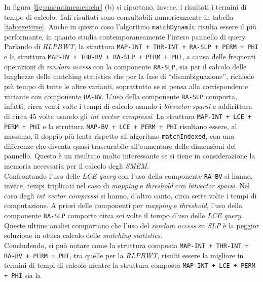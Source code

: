 In figura \ref{fig:smemtimememchr} (b) si riportano, invece, i risultati i
termini di tempo di calcolo. Tali risultati sono
consultabili numericamente in tabella \ref{tab:exetime}. Anche in questo caso
l'algoritmo 
\texttt{matchDynamic} risulta essere il più performante, in quanto studia
contemporaneamente l'intero pannello di query. Parlando di \textit{RLPBWT},  la
struttura \texttt{MAP-INT + THR-INT + RA-SLP + PERM + PHI} e la 
struttura 
\texttt{MAP-BV + THR-BV + RA-SLP + PERM + PHI}, a causa delle
frequenti operazioni di \textit{random access} con la componente
\texttt{RA-SLP}, sia per il calcolo delle lunghezze delle 
matching statistics che per la fase di ``disambiguazione'', richiede più tempo
di tutte le altre varianti, soprattutto se si pensa alla corrispondente
variante con componente \texttt{RA-BV}. L'uso della componente \texttt{RA-SLP}
comporta, infatti, circa venti volte i tempi di calcolo usando i
\textit{bitvector sparsi} e addirittura di circa 45 volte usando gli
\textit{int vector compressi}. La struttura \texttt{MAP-INT + LCE +
  PERM + PHI} e la struttura 
\texttt{MAP-BV + LCE + PERM + PHI} risultano essere, al massimo,
il doppio più lenta rispetto all'algoritmo \texttt{matchIndexed}, con una
differenze che diventa quasi trascurabile all'aumentare delle dimensioni del
pannello. Questo è un 
risultato molto interessante se si tiene in considerazione la memoria necessaria
per il calcolo degli \textit{SMEM}.\\
Confrontando l'uso delle \textit{LCE query} con l'uso della componente
\texttt{RA-BV} si hanno, invece, tempi triplicati nel caso di \textit{mapping} e
\textit{threshold} con \textit{bitvector sparsi}. Nel caso degli \textit{int
  vector compressi} si hanno, d'altro canto, circa sette volte i tempi di
computazione. A priori delle componenti per \textit{mapping} e
\textit{threshold}, l'uso della componente \texttt{RA-SLP} comporta circa sei
volte il tempo d'uso delle \textit{LCE query}. Queste ultime analisi comportano
che l'uso del \textit{random access} su \textit{SLP} è la peggior soluzione in
ottica calcolo delle \textit{matching statistics}.\\
Concludendo, si può notare come la struttura composta
\texttt{MAP-INT + THR-INT + RA-BV + PERM + PHI}, tra quelle per la
\textit{RLPBWT}, risulti essere la migliore in termini di tempi di calcolo
mentre la struttura composta \texttt{MAP-INT + LCE + PERM + PHI} sia la
